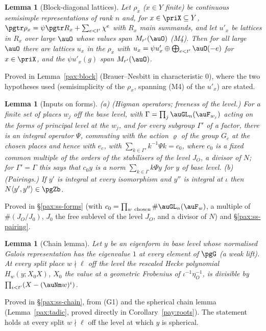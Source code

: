 \documentclass[10pt]{amsart}
\newtheorem{lemma}[theorem]{Lemma}
\theoremstyle{definition}
\theoremstyle{remark}
\begin{document}
\begin{lemma}[Block-diagonal lattices]\label{pri:block}
Let $\rho_x$ ($x\in Y$ finite) be continuous semisimple representations of rank $n$ and,
for $x\in\priX\subseteq Y$, $\pgtr\rho_x=\psi\pgtr R_x+\sum_{e<t'}\chi^e$ with $R_x$ main summands,
and let $u'_x$ be lattices in $R_x$ over large $\auO$ whose values span $M_{r'}(\auO)$ (M4). Then for
all large $\auO$ there are lattices $u_x$ in the $\rho_x$ with $u_x=\psi u'_x\oplus\bigoplus_{e<t'}
\auO(-e)$ for $x\in\priX$, and the $\psi u'_x(g)$ span $M_{r'}(\auO)$.
\end{lemma}
\noindent Proved in Lemma~\ref{pax:block} (Brauer--Nesbitt in characteristic $0$), where the two
hypotheses used (semisimplicity of the $\rho_x$, spanning (M4) of the $u'_x$) are stated.\par\smallskip

\begin{lemma}[Inputs on forms]\label{pri:forms}
(a) (Higman operators; freeness of the level.) For a finite set of places $w_j$ off the base level,
with $\Gamma=\prod_j\auGL_n(\auF_{w_j})$ acting on the forms of principal level at the $w_j$, and for
every subgroup $\Gamma'$ of a factor, there is an integral operator $\Psi$, commuting with the action $\varrho$ of the
group $G_c$ at the chosen places and hence with $e_c$, with
$\sum_{k\in\Gamma'}k^{-1}\Psi k=c_0$, where $c_0$ is a fixed common multiple of the orders of the
stabilisers of the level $J_O$, a divisor of $N$; for $\Gamma'=\Gamma$ this says that $c_0y$ is a norm
$\sum_{k\in\Gamma}k\Psi y$ for $y$ of base level. (b) (Pairings.) If $y'$ is integral at every
isomorphism and $y''$ is integral at $\iota$ then $N\langle y',y''\rangle\in\pgZb$.
\end{lemma}
\noindent Proved in \S\ref{pax:ss-forms} (with $c_0=\prod_{w\ \mathrm{chosen}}\#\auGL_n(\auF_w)$, a multiple of $\#(J_O/J_0)$, $J_0$ the free sublevel of the
level $J_O$, and a divisor of $N$) and \S\ref{pax:ss-pairing}.\par\smallskip

\begin{lemma}[Chain lemma]\label{pri:chain}
Let $y$ be an eigenform in base level whose normalised Galois representation has the eigenvalue
$1$ at every element of $\pgG$ (a \emph{weak lift}). At every split place $w\nmid\ell$ off the level
the rescaled Hecke polynomial $H_w(y;X_0X)$, $X_0$ the value at a geometric Frobenius of
$\iota^{-1}\eta_O^{-1}$, is divisible by $\prod_{i<t'}(X-(\auNm w)^i)$.
\end{lemma}
\noindent Proved in \S\ref{pax:ss-chain}, from (G1) and the spherical chain lemma
(Lemma~\ref{pax:tadic}, proved directly in Corollary~\ref{pay:roots}). The statement holds at every
split $w\nmid\ell$ off the level at which $y$ is spherical.\par\smallskip
\end{document}
